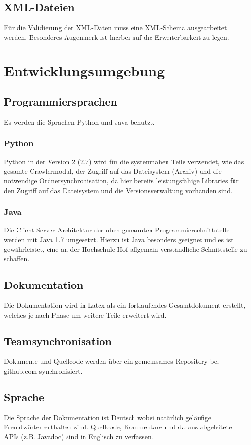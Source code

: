 \section{XML-Dateien} \label{spec:req:xml}
	Für die Validierung der XML-Daten muss eine XML-Schema ausgearbeitet werden.
	Besonderes Augenmerk ist hierbei auf die Erweiterbarkeit zu legen.

\chapter{Entwicklungsumgebung} \label{spec:req:devenv}
\section{Programmiersprachen}
	Es werden die Sprachen Python und Java benutzt.
	\subsection{Python}
		Python in der Version 2 (2.7) wird für die systemnahen Teile verwendet, wie das gesamte Crawlermodul, 
		der Zugriff auf das Dateisystem (Archiv) und die notwendige Ordnersynchronisation, 
		da hier bereits leistungsfähige Libraries für den Zugriff auf das Dateisystem und die Versionsverwaltung vorhanden sind.
	\subsection{Java}
		Die Client-Server Architektur der oben genannten Programmierschnittstelle werden mit Java 1.7 umgesetzt.
		Hierzu ist Java besonders geeignet und es ist gewährleistet, eine an der Hochschule Hof allgemein verständliche
		Schnittstelle zu schaffen.
\section{Dokumentation}
	Die Dokumentation wird in Latex als ein fortlaufendes Gesamtdokument erstellt, welches je nach Phase um weitere Teile erweitert wird.
\section{Teamsynchronisation}
	Dokumente und Quellcode werden über ein gemeinsames Repository bei github.com synchronisiert.
\section{Sprache}	
	Die Sprache der Dokumentation ist Deutsch wobei natürlich geläufige Fremdwörter enthalten sind. Quellcode, Kommentare und daraus abgeleitete APIs (z.B. Javadoc) sind in Englisch zu verfassen.

